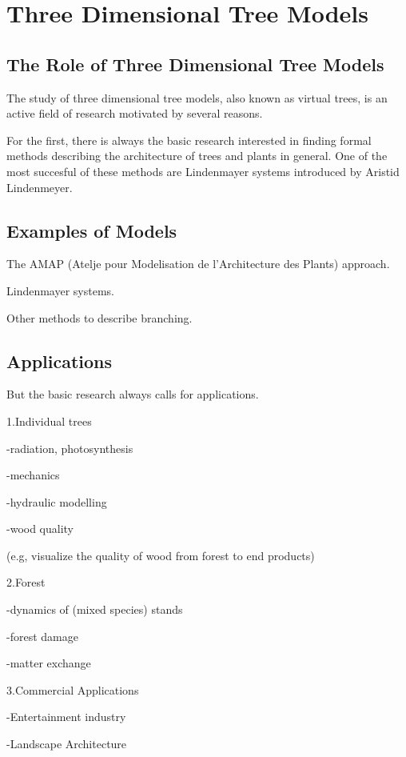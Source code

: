\chapter{Three Dimensional Tree Models}

\section{The Role of Three Dimensional Tree Models}

The study of three dimensional tree models, also
known as virtual trees, is an active
field of research motivated by several reasons. 

For the first, there is always the basic research interested in
finding formal methods describing the architecture of
trees and plants in general. One of the most succesful of 
these methods are Lindenmayer systems
introduced by Aristid Lindenmeyer.

\section{Examples of Models}
The AMAP (Atelje pour Modelisation de l'Architecture des Plants) approach.

Lindenmayer systems.

Other methods to describe branching.

\section{Applications}
But the basic research always calls for applications. 

1.Individual trees

-radiation, photosynthesis

-mechanics

-hydraulic modelling

-wood quality

(e.g, visualize the quality of wood from forest to end products)

2.Forest

-dynamics of (mixed species) stands

-forest damage 

-matter exchange

3.Commercial Applications

-Entertainment industry

-Landscape Architecture

